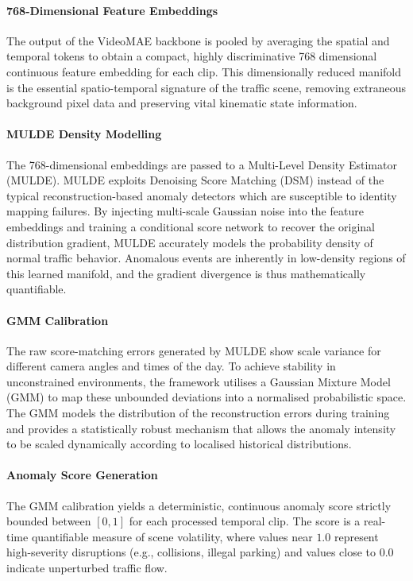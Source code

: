 \documentclass[conference]{IEEEtran}
\begin{document}
\paragraph{768-Dimensional Feature Embeddings}
The output of the VideoMAE backbone is pooled by averaging the spatial and temporal tokens to obtain a compact, highly discriminative 768 dimensional continuous feature embedding for each clip. This dimensionally reduced manifold is the essential spatio-temporal signature of the traffic scene, removing extraneous background pixel data and preserving vital kinematic state information.

\paragraph{MULDE Density Modelling}
The 768-dimensional embeddings are passed to a Multi-Level Density Estimator (MULDE). MULDE exploits Denoising Score Matching (DSM) instead of the typical reconstruction-based anomaly detectors which are susceptible to identity mapping failures. By injecting multi-scale Gaussian noise into the feature embeddings and training a conditional score network to recover the original distribution gradient, MULDE accurately models the probability density of normal traffic behavior.  Anomalous events are inherently in low-density regions of this learned manifold, and the gradient divergence is thus mathematically quantifiable.
\paragraph{GMM Calibration}
The raw score-matching errors generated by MULDE show scale variance for different camera angles and times of the day. To achieve stability in unconstrained environments, the framework utilises a Gaussian Mixture Model (GMM) to map these unbounded deviations into a normalised probabilistic space. The GMM models the distribution of the reconstruction errors during training and provides a statistically robust mechanism that allows the anomaly intensity to be scaled dynamically according to localised historical distributions.

\paragraph{Anomaly Score Generation}
The GMM calibration yields a deterministic, continuous anomaly score strictly bounded between $[0, 1]$ for each processed temporal clip. The score is a real-time quantifiable measure of scene volatility, where values near $1.0$ represent high-severity disruptions (e.g., collisions, illegal parking) and values close to $0.0$ indicate unperturbed traffic flow.
\end{document}
